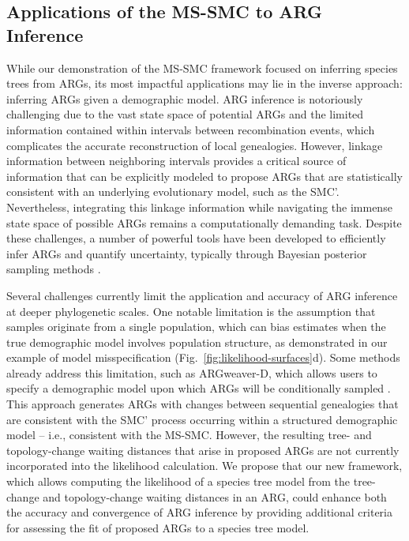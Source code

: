 \documentclass[11pt]{article}
\begin{document}
\subsection{Applications of the MS-SMC to ARG Inference}
While our demonstration of the MS-SMC framework focused on inferring
species trees from ARGs, its most impactful applications may lie 
in the inverse approach: inferring ARGs given a demographic model.
ARG inference is notoriously challenging due to the vast state
space of potential ARGs and the limited information contained
within intervals between recombination events, which complicates
the accurate reconstruction of local genealogies.
However, linkage information between neighboring intervals provides
a critical source of information that can be explicitly
modeled to propose ARGs that are statistically consistent with
an underlying evolutionary model, such as the SMC'.
% 
Nevertheless, integrating this linkage information while navigating
the immense state space of possible ARGs remains a computationally
demanding task. 
Despite these challenges, 
a number of powerful tools have been developed to efficiently 
infer ARGs and quantify uncertainty, typically through Bayesian 
posterior sampling methods
\citep{y_c_brandt_evaluation_2022,lewanski_era_2024}.


Several challenges currently limit the application and accuracy
of ARG inference at deeper phylogenetic scales. One notable limitation
is the assumption that samples originate from a single population,
which can bias estimates when the true demographic model involves 
population structure, as demonstrated in our example of model 
misspecification (Fig.~\ref{fig:likelihood-surfaces}d). 
Some methods already address this limitation, such as ARGweaver-D,
which allows users to specify a demographic model upon which ARGs 
will be conditionally sampled 
\citep{hubisz2020inference}.
% 
This approach generates ARGs with changes between sequential genealogies 
that are consistent with the SMC' process occurring within a structured
demographic model -- i.e., consistent with the MS-SMC. 
% 
However, the resulting tree- and topology-change waiting distances that 
arise in proposed ARGs are not currently incorporated into the 
likelihood calculation.
% 
We propose that our new framework, which allows computing the likelihood 
of a species tree model from the tree-change and topology-change waiting
distances in an ARG, 
could enhance both the accuracy and convergence of ARG inference by 
providing additional criteria for assessing the fit of proposed ARGs
to a species tree model.
\end{document}
